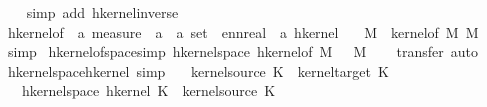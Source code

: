 \begin{isabellebody}
%
\isadelimproof
\ \ %
\endisadelimproof
%
\isatagproof
{}\isamarkupfalse%
\ {\isacharparenleft}{\kern0pt}simp\ add{\isacharcolon}{\kern0pt}\ hkernel{\isacharunderscore}{\kern0pt}inverse{\isacharparenright}{\kern0pt}%
\endisatagproof
{\isafoldproof}%
%
\isadelimproof
\isanewline
%
\endisadelimproof
\isanewline
{}\isamarkupfalse%
\ hkernel{\isacharunderscore}{\kern0pt}of\ {\isacharcolon}{\kern0pt}{\isacharcolon}{\kern0pt}\ {\isachardoublequoteopen}{\isacharprime}{\kern0pt}a\ measure\ {\isasymRightarrow}\ {\isacharparenleft}{\kern0pt}{\isacharprime}{\kern0pt}a\ {\isasymRightarrow}\ {\isacharprime}{\kern0pt}a\ set\ {\isasymRightarrow}\ ennreal{\isacharparenright}{\kern0pt}\ {\isasymRightarrow}\ {\isacharprime}{\kern0pt}a\ hkernel{\isachardoublequoteclose}\isanewline
\ \ \ {\isachardoublequoteopen}{\isasymlambda}M\ {\isasymkappa}{\isachardot}{\kern0pt}\ kernel{\isacharunderscore}{\kern0pt}of\ M\ M\ {\isasymkappa}{\isachardoublequoteclose}\isanewline
%
\isadelimproof
\ \ %
\endisadelimproof
%
\isatagproof
{}\isamarkupfalse%
\ simp%
\endisatagproof
{\isafoldproof}%
%
\isadelimproof
\isanewline
%
\endisadelimproof
\isanewline
{}\isamarkupfalse%
\ hkernel{\isacharunderscore}{\kern0pt}of{\isacharunderscore}{\kern0pt}space{\isacharbrackleft}{\kern0pt}simp{\isacharbrackright}{\kern0pt}{\isacharcolon}{\kern0pt}\ {\isachardoublequoteopen}hkernel{\isacharunderscore}{\kern0pt}space\ {\isacharparenleft}{\kern0pt}hkernel{\isacharunderscore}{\kern0pt}of\ M\ {\isasymkappa}{\isacharparenright}{\kern0pt}\ {\isacharequal}{\kern0pt}\ M{\isachardoublequoteclose}\isanewline
%
\isadelimproof
\ \ %
\endisadelimproof
%
\isatagproof
{}\isamarkupfalse%
\ {\isacharparenleft}{\kern0pt}transfer{\isacharcomma}{\kern0pt}\ auto{\isacharparenright}{\kern0pt}%
\endisatagproof
{\isafoldproof}%
%
\isadelimproof
\isanewline
%
\endisadelimproof
\isanewline
{}\isamarkupfalse%
\ hkernel{\isacharunderscore}{\kern0pt}space{\isacharunderscore}{\kern0pt}hkernel\ {\isacharbrackleft}{\kern0pt}simp{\isacharbrackright}{\kern0pt}{\isacharcolon}{\kern0pt}\isanewline
\ \ \ {\isachardoublequoteopen}kernel{\isacharunderscore}{\kern0pt}source\ K\ {\isacharequal}{\kern0pt}\ kernel{\isacharunderscore}{\kern0pt}target\ K{\isachardoublequoteclose}\isanewline
\ \ \ {\isachardoublequoteopen}hkernel{\isacharunderscore}{\kern0pt}space\ {\isacharparenleft}{\kern0pt}hkernel\ K{\isacharparenright}{\kern0pt}\ {\isacharequal}{\kern0pt}\ kernel{\isacharunderscore}{\kern0pt}source\ K{\isachardoublequoteclose}\isanewline

\end{isabellebody}
